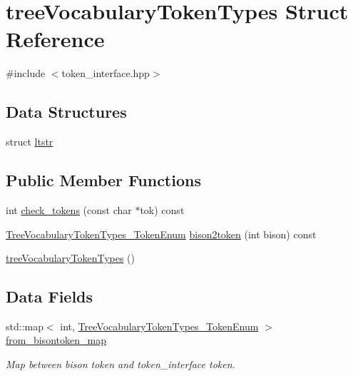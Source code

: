 \hypertarget{structtreeVocabularyTokenTypes}{}\section{tree\+Vocabulary\+Token\+Types Struct Reference}
\label{structtreeVocabularyTokenTypes}


{\ttfamily \#include $<$token\+\_\+interface.\+hpp$>$}

\subsection*{Data Structures}
\begin{DoxyCompactItemize}
\item 
struct \hyperlink{structtreeVocabularyTokenTypes_1_1ltstr}{ltstr}
\end{DoxyCompactItemize}
\subsection*{Public Member Functions}
\begin{DoxyCompactItemize}
\item 
int \hyperlink{structtreeVocabularyTokenTypes_a1f8fb36f5815cf635d0d52afd6ba4a8d}{check\+\_\+tokens} (const char $\ast$tok) const
\item 
\hyperlink{token__interface_8hpp_a14502d0757789149f644966ca931b126}{Tree\+Vocabulary\+Token\+Types\+\_\+\+Token\+Enum} \hyperlink{structtreeVocabularyTokenTypes_ab4064fe16e9227fa37e51047d5857f86}{bison2token} (int bison) const
\item 
\hyperlink{structtreeVocabularyTokenTypes_a7d0465713642ad90a2131e2f14c94273}{tree\+Vocabulary\+Token\+Types} ()
\end{DoxyCompactItemize}
\subsection*{Data Fields}
\begin{DoxyCompactItemize}
\item 
std\+::map$<$ int, \hyperlink{token__interface_8hpp_a14502d0757789149f644966ca931b126}{Tree\+Vocabulary\+Token\+Types\+\_\+\+Token\+Enum} $>$ \hyperlink{structtreeVocabularyTokenTypes_a3e052c179911e90bec55b71035deb620}{from\+\_\+bisontoken\+\_\+map}
\begin{DoxyCompactList}\small\item\em Map between bison token and token\+\_\+interface token. \end{DoxyCompactList}\end{DoxyCompactItemize}
